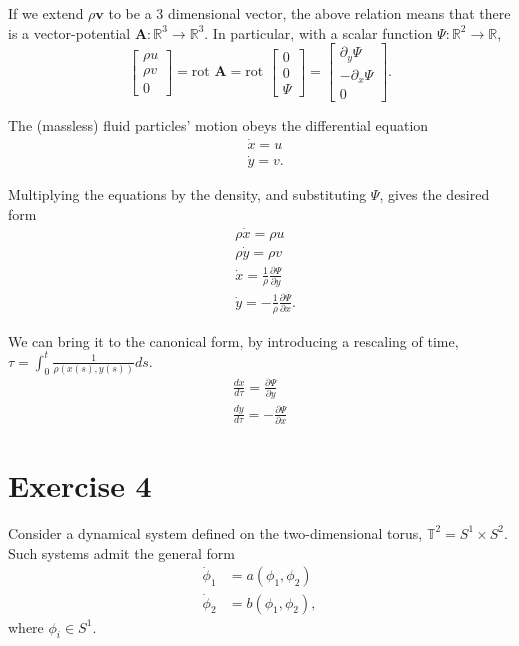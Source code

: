 \documentclass[a4paper,11pt,pdftex]{article}
\newcommand{\R}{\mathbb{R}}
\newcommand{\T}{\mathbb{T}}
\begin{document}
If we extend $\rho \mathbf{v}$ to be a 3 dimensional vector, the above relation means that there is a vector-potential $\mathbf{A}:\R^3\to \R^3$. In particular, with a scalar function $\Psi:\R^2 \to \R$,
$$
\begin{bmatrix}\rho u \\ \rho v\\ 0 \end{bmatrix}=\text{rot } \mathbf{A} = \text{rot } \begin{bmatrix} 0 \\ 0 \\ \Psi \end{bmatrix} = \begin{bmatrix} \partial_y \Psi \\ -\partial_x \Psi \\ 0 \end{bmatrix}. 
$$

The (massless) fluid particles' motion obeys the differential equation
\begin{align*}
    &\dot{x} = u \\
    &\dot{y} = v.
\end{align*}

Multiplying the equations by the density, and substituting $\Psi$, gives the desired form
\begin{align*}
    &\rho\dot{x} = \rho u \\
    &\rho\dot{y} = \rho v \\
    &\dot{x} = \frac{1}{\rho}\frac{\partial \Psi}{\partial y}\\
    &\dot{y} = -\frac{1}{\rho}\frac{\partial \Psi}{\partial x}. 
\end{align*}

We can bring it to the canonical form, by introducing a rescaling of time, $\tau = \int_0^t\frac{1}{\rho(x(s),y(s))}ds$.
\begin{align}
    \frac{d x}{d\tau} = \frac{\partial \Psi}{\partial y} \\
    \frac{d y}{d\tau} = -\frac{\partial \Psi}{\partial x} 
\end{align}


\section*{Exercise 4}

Consider a dynamical system defined on the two-dimensional torus, $\T^2 = S^1 \times S^2$. Such systems admit the general form
\begin{align*}
    \dot{\phi}_1 &= a(\phi_1, \phi_2) \\
    \dot{\phi}_2 &= b(\phi_1, \phi_2),
\end{align*}
where $\phi_i\in S^1$. 
\end{document}
